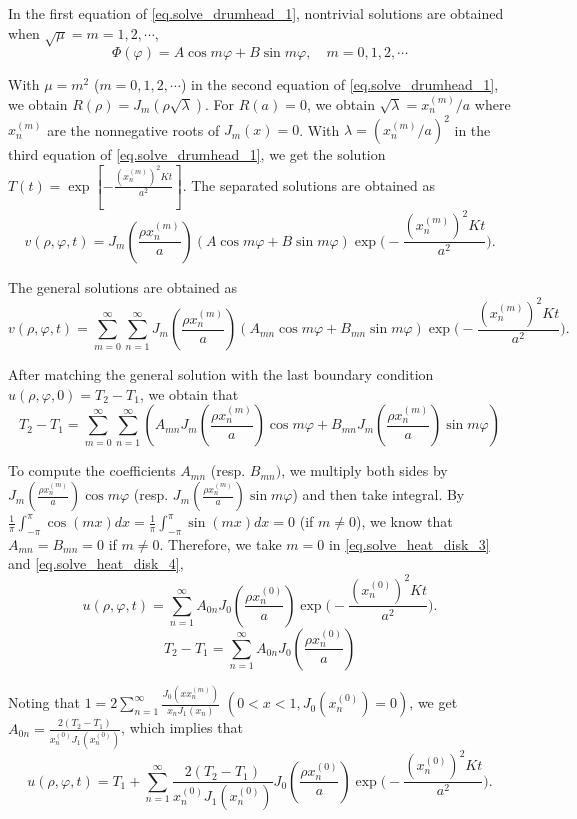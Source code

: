 In the first equation of \eqref{eq.solve_drumhead_1}, nontrivial solutions are obtained when $\sqrt{\mu} = m = 1,2, \cdots$,
$$
\Phi(\varphi)=A \cos m \varphi+B \sin m \varphi, \quad m=0,1,2, \cdots
$$


With $\mu=m^2$ ($m=0,1,2, \cdots$) in the second equation of \eqref{eq.solve_drumhead_1}, we obtain $R(\rho)=J_m(\rho \sqrt{\lambda})$. For $R(a)=0$, we obtain $\sqrt{\lambda}=x_n^{(m)} / a$ where $x_n^{(m)}$ are the nonnegative roots of $J_m(x)=0$. With $\lambda = \left(x_n^{(m)} / a\right)^2$ in the third equation of \eqref{eq.solve_drumhead_1}, we get the solution $T(t) = \exp \left[-\frac{\left(x_n^{(m)}\right)^2 K t}{a^2}\right]$. The separated solutions are obtained as
\begin{equation}\label{eq.solve_heat_disk_2}
    v(\rho, \varphi, t)=J_m\left(\frac{\rho x_n^{(m)}}{a}\right)(A \cos m \varphi+B \sin m \varphi)\exp \Bigg(-\frac{\left(x_n^{(m)}\right)^2 K t}{a^2}\Bigg).
\end{equation}

The general solutions are obtained as
\begin{equation}\label{eq.solve_heat_disk_3}
    v(\rho, \varphi, t)=\sum_{m=0}^{\infty} \sum_{n=1}^{\infty} J_m\left(\frac{\rho x_n^{(m)}}{a}\right)\left(A_{m n} \cos m \varphi+B_{m n} \sin m \varphi\right) \exp \Bigg(-\frac{\left(x_n^{(m)}\right)^2 K t}{a^2}\Bigg).
\end{equation}

After matching the general solution with the last boundary condition $u(\rho, \varphi, 0)=T_2-T_1$, we obtain that 
\begin{equation}\label{eq.solve_heat_disk_4}
    T_2-T_1 = \sum_{m=0}^{\infty} \sum_{n=1}^{\infty}\left(A_{m n} J_m\left(\frac{\rho x_n^{(m)}}{a}\right) \cos m \varphi+B_{m n} J_m\left(\frac{\rho x_n^{(m)}}{a}\right) \sin m \varphi\right)
\end{equation}

To compute the coefficients $A_{m n}$ (resp. $B_{m n})$, we multiply both sides by $J_m\left(\frac{\rho x_n^{(m)}}{a}\right) \cos m \varphi$ (resp. $J_m\left(\frac{\rho x_n^{(m)}}{a}\right) \sin m \varphi$) and then take integral. By $\frac{1}{\pi} \int_{-\pi}^\pi \cos (m x) d x = \frac{1}{\pi} \int_{-\pi}^\pi \sin (m x) d x = 0$ (if $m\neq 0$), we know that $A_{m n} = B_{m n} = 0$ if $m\neq 0$. Therefore, we take $m = 0$ in \eqref{eq.solve_heat_disk_3} and \eqref{eq.solve_heat_disk_4},
$$
u(\rho, \varphi, t)=\sum_{n=1}^{\infty} A_{0 n} J_0\left(\frac{\rho x_n^{(0)}}{a}\right) \exp \Bigg(-\frac{\left(x_n^{(0)}\right)^2 K t}{a^2}\Bigg).
$$
\[
    T_2-T_1 = \sum_{n=1}^{\infty} A_{0 n} J_0\left(\frac{\rho x_n^{(0)}}{a}\right)
\]

Noting that $1=2 \sum_{n=1}^{\infty} \frac{J_0\left(x x_n^{(m)}\right)}{x_n J_1\left(x_n\right)}$ $(0<x<1, J_0\left(x_n^{(0)}\right)=0)$, we get $A_{0n} = \frac{2(T_2-T_1)}{x_n^{(0)} J_1\left(x_n^{(0)}\right)}$, which implies that 
$$
u(\rho, \varphi, t)=T_1+\sum_{n=1}^{\infty} \frac{2(T_2-T_1)}{x_n^{(0)} J_1\left(x_n^{(0)}\right)} J_0\left(\frac{\rho x_n^{(0)}}{a}\right) \exp \Bigg(-\frac{\left(x_n^{(0)}\right)^2 K t}{a^2}\Bigg).
$$